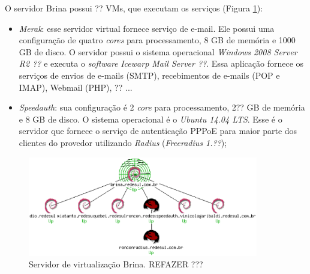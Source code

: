 O servidor Brina possui ?? \ac{VM}s, que executam os serviços (Figura \ref{fig:servlog1}):
\begin{itemize}
 \item \textit{Merak}: esse servidor virtual fornece serviço de e-mail. Ele possui uma configuração de quatro \textit{cores} para processamento, 
 8 GB de memória e 1000 GB de disco. O servidor possui o sistema operacional \textit{Windows 2008 Server R2 ??} e executa o \textit{software} 
 \textit{Icewarp Mail Server ??}. Essa aplicação fornece os serviços de envios de e-mails (\ac{SMTP}), recebimentos de e-mails (\ac{POP} e 
 \ac{IMAP}), Webmail (\ac{PHP}), ?? ... %

 \item \textit{Speedauth}: sua configuração é 2 \textit{core} para processamento, 2?? GB de memória e 8 GB de disco. O sistema operacional é o 
 \textit{Ubuntu 14.04 \ac{LTS}}. Esse é o servidor que fornece o serviço de autenticação \ac{PPPoE} para maior parte dos clientes do provedor 
 utilizando \textit{Radius} (\textit{Freeradius 1.??});
\end{itemize}

\begin{figure}[h!]
 \centering
 \includegraphics[width=380px]{img/servlog1.eps}
 \caption{Servidor de virtualização Brina. REFAZER ???}
 \label{fig:servlog1}
\end{figure}

